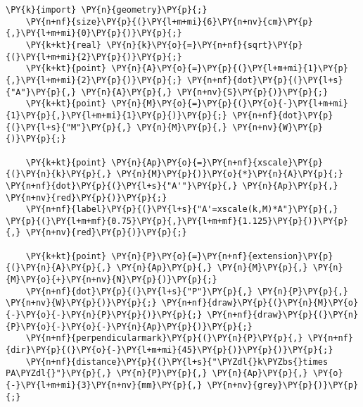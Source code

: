 \begin{Verbatim}[commandchars=\\\{\}]
    \PY{k}{import} \PY{n}{geometry}\PY{p}{;}
    \PY{n+nf}{size}\PY{p}{(}\PY{l+m+mi}{6}\PY{n+nv}{cm}\PY{p}{,}\PY{l+m+mi}{0}\PY{p}{)}\PY{p}{;}
    \PY{k+kt}{real} \PY{n}{k}\PY{o}{=}\PY{n+nf}{sqrt}\PY{p}{(}\PY{l+m+mi}{2}\PY{p}{)}\PY{p}{;}
    \PY{k+kt}{point} \PY{n}{A}\PY{o}{=}\PY{p}{(}\PY{l+m+mi}{1}\PY{p}{,}\PY{l+m+mi}{2}\PY{p}{)}\PY{p}{;} \PY{n+nf}{dot}\PY{p}{(}\PY{l+s}{"A"}\PY{p}{,} \PY{n}{A}\PY{p}{,} \PY{n+nv}{S}\PY{p}{)}\PY{p}{;}
    \PY{k+kt}{point} \PY{n}{M}\PY{o}{=}\PY{p}{(}\PY{o}{-}\PY{l+m+mi}{1}\PY{p}{,}\PY{l+m+mi}{1}\PY{p}{)}\PY{p}{;} \PY{n+nf}{dot}\PY{p}{(}\PY{l+s}{"M"}\PY{p}{,} \PY{n}{M}\PY{p}{,} \PY{n+nv}{W}\PY{p}{)}\PY{p}{;}

    \PY{k+kt}{point} \PY{n}{Ap}\PY{o}{=}\PY{n+nf}{xscale}\PY{p}{(}\PY{n}{k}\PY{p}{,} \PY{n}{M}\PY{p}{)}\PY{o}{*}\PY{n}{A}\PY{p}{;} \PY{n+nf}{dot}\PY{p}{(}\PY{l+s}{"A'"}\PY{p}{,} \PY{n}{Ap}\PY{p}{,} \PY{n+nv}{red}\PY{p}{)}\PY{p}{;}
    \PY{n+nf}{label}\PY{p}{(}\PY{l+s}{"A'=xscale(k,M)*A"}\PY{p}{,} \PY{p}{(}\PY{l+m+mf}{0.75}\PY{p}{,}\PY{l+m+mf}{1.125}\PY{p}{)}\PY{p}{,} \PY{n+nv}{red}\PY{p}{)}\PY{p}{;}

    \PY{k+kt}{point} \PY{n}{P}\PY{o}{=}\PY{n+nf}{extension}\PY{p}{(}\PY{n}{A}\PY{p}{,} \PY{n}{Ap}\PY{p}{,} \PY{n}{M}\PY{p}{,} \PY{n}{M}\PY{o}{+}\PY{n+nv}{N}\PY{p}{)}\PY{p}{;}
    \PY{n+nf}{dot}\PY{p}{(}\PY{l+s}{"P"}\PY{p}{,} \PY{n}{P}\PY{p}{,} \PY{n+nv}{W}\PY{p}{)}\PY{p}{;} \PY{n+nf}{draw}\PY{p}{(}\PY{n}{M}\PY{o}{-}\PY{o}{-}\PY{n}{P}\PY{p}{)}\PY{p}{;} \PY{n+nf}{draw}\PY{p}{(}\PY{n}{P}\PY{o}{-}\PY{o}{-}\PY{n}{Ap}\PY{p}{)}\PY{p}{;}
    \PY{n+nf}{perpendicularmark}\PY{p}{(}\PY{n}{P}\PY{p}{,} \PY{n+nf}{dir}\PY{p}{(}\PY{o}{-}\PY{l+m+mi}{45}\PY{p}{)}\PY{p}{)}\PY{p}{;}
    \PY{n+nf}{distance}\PY{p}{(}\PY{l+s}{"\PYZdl{}k\PYZbs{}times PA\PYZdl{}"}\PY{p}{,} \PY{n}{P}\PY{p}{,} \PY{n}{Ap}\PY{p}{,} \PY{o}{-}\PY{l+m+mi}{3}\PY{n+nv}{mm}\PY{p}{,} \PY{n+nv}{grey}\PY{p}{)}\PY{p}{;}
\end{Verbatim}
